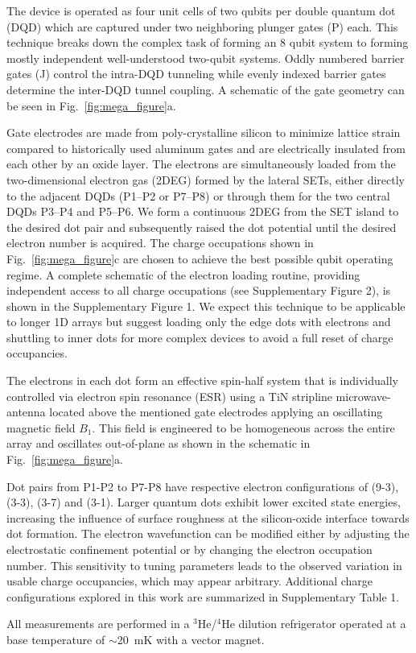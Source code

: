 \documentclass[superscriptaddress,twocolumn,10pt,prl,floatfix,nofootinbib,aps]{revtex4-2}
\newcommand{\change}[1]{%
\textcolor{reviewercolor}{\ignorespaces#1\unskip}%
}
\begin{document}
The device is operated as four unit cells of two qubits per double quantum dot (DQD) which are captured under two neighboring plunger gates (P) each. This technique breaks down the complex task of forming an 8 qubit system to forming mostly independent well-understood two-qubit systems. Oddly numbered barrier gates (J) control the intra-DQD tunneling while evenly indexed barrier gates determine the inter-DQD tunnel coupling. A schematic of the gate geometry can be seen in Fig.~\ref{fig:mega_figure}a.

Gate electrodes are made from poly-crystalline silicon to minimize lattice strain compared to historically used aluminum gates \cite{huang_high-fidelity_2024,veldhorst_two-qubit_2015} and are electrically insulated from each other by an oxide layer.
The electrons are simultaneously loaded from the two-dimensional electron gas (2DEG) formed by the lateral SETs, either directly to the adjacent DQDs (P1--P2 or P7--P8) or through them for the two central DQDs P3--P4 and P5--P6. We form a continuous 2DEG from the SET island to the desired dot pair and subsequently raised the dot potential until the desired electron number is acquired. The charge occupations shown in Fig.~\ref{fig:mega_figure}c are chosen to achieve the best possible qubit operating regime. A complete schematic of the electron loading routine, providing independent access to all charge occupations (see Supplementary Figure 2), is shown in the Supplementary Figure 1.
\change{
    We expect this technique to be applicable to longer 1D arrays but suggest loading only the edge dots with electrons and shuttling to inner dots for more complex devices to avoid a full reset of charge occupancies.
}

\change{
    The electrons in each dot form an effective spin-half system that is individually controlled via electron spin resonance (ESR) using a TiN stripline microwave-antenna located above the mentioned gate electrodes applying an oscillating magnetic field $B_1$. 
    This field is engineered to be homogeneous across the entire array and oscillates out-of-plane as shown in the schematic in Fig.~\ref{fig:mega_figure}a.
}
Dot pairs from P1-P2 to P7-P8 have respective electron configurations of (9-3), (3-3), (3-7) and (3-1).
\change{
    Larger quantum dots exhibit lower excited state energies, increasing the influence of surface roughness at the silicon-oxide interface towards dot formation.
    The electron wavefunction can be modified either by adjusting the electrostatic confinement potential or by changing the electron occupation number.
    This sensitivity to tuning parameters leads to the observed variation in usable charge occupancies, which may appear arbitrary.
    Additional charge configurations explored in this work are summarized in Supplementary Table 1.
}
All measurements are performed in a $^3$He/$^4$He dilution refrigerator operated at a base temperature of $\sim$\SI{20}{\milli \kelvin} with a vector magnet.
\end{document}
